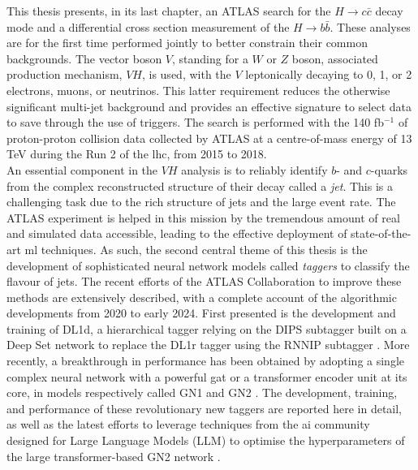 \newpage
This thesis presents, in its last chapter, an ATLAS search for the $H \rightarrow c\bar{c}$ decay mode and a differential cross section measurement of the $H \rightarrow b\bar{b}$. These analyses are for the first time performed jointly to better constrain their common backgrounds. The vector boson $V$, standing for a $W$ or $Z$ boson, associated production mechanism, $VH$, is used, with the $V$ leptonically decaying to 0, 1, or 2 electrons, muons, or neutrinos. This latter requirement reduces the otherwise significant multi-jet background and provides an effective signature to select data to save through the use of triggers. The search is performed with the 140 fb$^{-1}$ of proton-proton collision data collected by ATLAS at a centre-of-mass energy of 13 TeV during the Run 2 of the \gls{lhc}, from 2015 to 2018. \\

An essential component in the $VH$ analysis is to reliably identify $b$- and $c$-quarks from the complex reconstructed structure of their decay called a \textit{jet}. This is a challenging task due to the rich structure of jets and the large event rate. The ATLAS experiment is helped in this mission by the tremendous amount of real and simulated data accessible, leading to the effective deployment of state-of-the-art \gls{ml} techniques. As such, the second central theme of this thesis is the development of sophisticated neural network models called \textit{taggers} to classify the flavour of jets. The recent efforts of the ATLAS Collaboration to improve these methods are extensively described, with a complete account of the algorithmic developments from 2020 to early 2024. First presented is the development and training of DL1d, a hierarchical tagger relying on the DIPS subtagger built on a Deep Set network to replace the DL1r tagger using the RNNIP subtagger \cite{ATL-PLOT-FTAG-2023-01}. More recently, a breakthrough in performance has been obtained by adopting a single complex neural network with a powerful \gls{gat} or a transformer encoder unit at its core, in models respectively called GN1 \cite{ATL-PHYS-PUB-2022-027} and GN2 \cite{duperrin2023flavour}. The development, training, and performance of these revolutionary new taggers are reported here in detail, as well as the latest efforts to leverage techniques from the \gls{ai} community designed for Large Language Models (LLM) to optimise the hyperparameters of the large transformer-based GN2 network \cite{yang2021tuning, publicplotMUP}. \\

